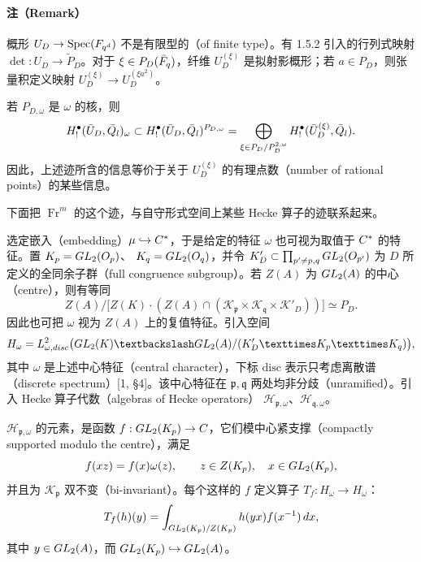 \paragraph*{注（Remark）}
概形 $U_D\to\operatorname{Spec}(F_{q^d})$ 不是有限型的（of finite type）。有 1.5.2 引入的行列式映射 $\det:U_D\to\widetilde P_D$。对于
$\xi\in P_D(\bar{F}_q)$，纤维 $U_D^{(\xi)}$ 是拟射影概形；若 $a\in P_D$，则张量积定义映射
$U_D^{(\xi)}\to U_D^{(\xi a^2)}$。

若 $P_{D,\omega}$ 是 $\omega$ 的核，则
\[
H_!^\bullet(\bar U_D,\bar{Q}_l)_\omega
\subset H_!^\bullet(\bar U_D,\bar{Q}_l)^{P_{D,\omega}}
=\bigoplus_{\xi\in P_D/P_D^{2,\omega}}
H_!^\bullet(\bar U_D^{(\xi)},\bar{Q}_l).
\]
因此，上述迹所含的信息等价于关于 $U_D^{(\xi)}$ 的有理点数（number of rational points）的某些信息。

下面把 $\operatorname{Fr}^m$ 的这个迹，与自守形式空间上某些 Hecke 算子的迹联系起来。

选定嵌入（embedding）$\mu\hookrightarrow C^*$，于是给定的特征 $\omega$ 也可视为取值于 $C^*$ 的特征。置
$K_{p}=GL_2(O_{p})$、
$K_{q}=GL_2(O_{q})$，并令
$K'_D\subset\prod_{p'\ne p,q}GL_2(O_{p'})$
为 $D$ 所定义的全同余子群（full congruence subgroup）。若 $Z(A)$ 为 $GL_2(A)$ 的中心（centre），则有等同
\[
Z(A)\big/\bigl[Z(K)\cdot(Z(A)\cap(\mathcal K_{\mathfrak p}\times\mathcal K_{\mathfrak q}\times\mathcal K'_D))\bigr]
\simeq P_D.
\]
因此也可把 $\omega$ 视为 $Z(A)$ 上的复值特征。引入空间
\[
H_\omega=L^2_{\omega,\mathrm{disc}}
\bigl(\GL_2(K)\backslash\GL_2(A)/(\mathcal K'_D\times\mathcal K_{\mathfrak p}\times\mathcal K_{\mathfrak q})\bigr),
\]
其中 $\omega$ 是上述中心特征（central character），下标 $\mathrm{disc}$ 表示只考虑离散谱（discrete spectrum）[1, §4]。该中心特征在 $\mathfrak p,\mathfrak q$ 两处均非分歧（unramified）。引入 Hecke 算子代数（algebras of Hecke operators）
$\mathcal H_{\mathfrak p,\omega}$、$\mathcal H_{\mathfrak q,\omega}$。

$\mathcal H_{\mathfrak p,\omega}$ 的元素，是函数 $f:GL_2(K_{p})\to C$，它们模中心紧支撑（compactly supported modulo the centre），满足
\[
f(xz)=f(x)\omega(z),\qquad z\in Z(K_{p}),\quad x\in GL_2(K_{p}),
\]
并且为 $\mathcal K_{\mathfrak p}$ 双不变（bi-invariant）。每个这样的 $f$ 定义算子
$T_f:H_\omega\to H_\omega$：
\[
T_f(h)(y)=\int_{GL_2(K_{p})/Z(K_{p})}
h(yx)f(x^{-1})\,dx,
\]
其中 $y\in GL_2(A)$，而 $GL_2(K_{p})\hookrightarrow GL_2(A)$。

